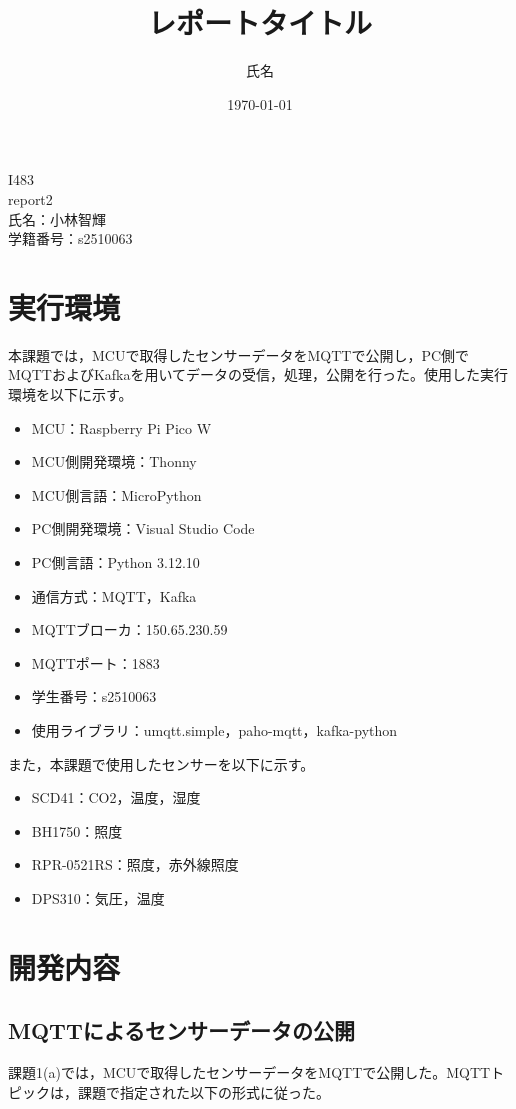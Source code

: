\documentclass[a4paper,11pt,lualatex,ja=standard]{bxjsarticle}
\newcommand{\cover}[3]{
  \thispagestyle{empty}
  \vspace*{4cm}
  \begin{center}
    {\LARGE #1}\\[2cm]
    {\Large #2}\\[3cm]
    {\large 氏名：#3}\\[1cm]
    {\large 学籍番号：s2510063}
  \end{center}
  \newpage
}
\begin{document}
\cover{I483}{report2}{小林智輝}

\title{レポートタイトル}
\author{氏名}
\date{\today}


\section{実行環境}

本課題では，MCUで取得したセンサーデータをMQTTで公開し，PC側でMQTTおよびKafkaを用いてデータの受信，処理，公開を行った。使用した実行環境を以下に示す。

\begin{itemize}
\item MCU：Raspberry Pi Pico W
\item MCU側開発環境：Thonny
\item MCU側言語：MicroPython
\item PC側開発環境：Visual Studio Code
\item PC側言語：Python 3.12.10
\item 通信方式：MQTT，Kafka
\item MQTTブローカ：150.65.230.59
\item MQTTポート：1883
\item 学生番号：s2510063
\item 使用ライブラリ：umqtt.simple，paho-mqtt，kafka-python
\end{itemize}

また，本課題で使用したセンサーを以下に示す。

\begin{itemize}
\item SCD41：CO2，温度，湿度
\item BH1750：照度
\item RPR-0521RS：照度，赤外線照度
\item DPS310：気圧，温度
\end{itemize}

\section{開発内容}

\subsection{MQTTによるセンサーデータの公開}

課題1(a)では，MCUで取得したセンサーデータをMQTTで公開した。MQTTトピックは，課題で指定された以下の形式に従った。
\end{document}
